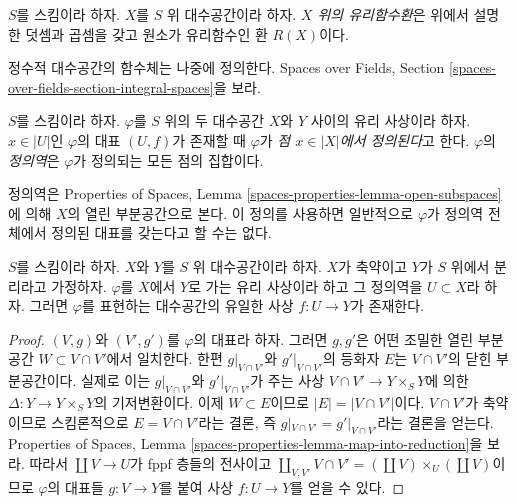 \begin{definition}
\label{definition-ring-of-rational-functions}
$S$를 스킴이라 하자.
$X$를 $S$ 위 대수공간이라 하자.
{\it $X$ 위의 유리함수환}은 위에서 설명한 덧셈과 곱셈을 갖고 원소가
유리함수인 환 $R(X)$이다.
\end{definition}

\noindent
정수적 대수공간의 함수체는 나중에 정의한다. Spaces over Fields,
Section \ref{spaces-over-fields-section-integral-spaces}을 보라.

\begin{definition}
\label{definition-domain-of-definition}
$S$를 스킴이라 하자. $\varphi$를 $S$ 위의 두 대수공간 $X$와 $Y$ 사이의
유리 사상이라 하자. $x \in |U|$인 $\varphi$의 대표
$(U, f)$가 존재할 때 $\varphi$가 {\it 점 $x \in |X|$에서 정의된다}고
한다. $\varphi$의 {\it 정의역}은 $\varphi$가 정의되는 모든 점의
집합이다.
\end{definition}

\noindent
정의역은 Properties of Spaces, Lemma
\ref{spaces-properties-lemma-open-subspaces}에 의해 $X$의 열린 부분공간으로
본다. 이 정의를 사용하면 일반적으로 $\varphi$가 정의역 전체에서 정의된
대표를 갖는다고 할 수는 없다.

\begin{lemma}
\label{lemma-rational-map-from-reduced-to-separated}
$S$를 스킴이라 하자. $X$와 $Y$를 $S$ 위 대수공간이라 하자.
$X$가 축약이고 $Y$가 $S$ 위에서 분리라고 가정하자. $\varphi$를
$X$에서 $Y$로 가는 유리 사상이라 하고 그 정의역을 $U \subset X$라
하자. 그러면 $\varphi$를 표현하는 대수공간의 유일한 사상
$f : U \to Y$가 존재한다.
\end{lemma}

\begin{proof}
$(V, g)$와 $(V', g')$를 $\varphi$의 대표라 하자. 그러면 $g, g'$은 어떤
조밀한 열린 부분공간 $W \subset V \cap V'$에서 일치한다. 한편
$g|_{V \cap V'}$와 $g'|_{V \cap V'}$의 등화자 $E$는
$V \cap V'$의 닫힌 부분공간이다. 실제로 이는 $g|_{V \cap V'}$와
$g'|_{V \cap V'}$가 주는 사상 $V \cap V' \to Y \times_S Y$에 의한
$\Delta : Y \to Y \times_S Y$의 기저변환이다. 이제 $W \subset E$이므로
$|E| = |V \cap V'|$이다. $V \cap V'$가 축약이므로 스킴론적으로
$E = V \cap V'$라는 결론, 즉 $g|_{V \cap V'} = g'|_{V \cap V'}$라는
결론을 얻는다. Properties of Spaces, Lemma
\ref{spaces-properties-lemma-map-into-reduction}을 보라. 따라서
$\coprod V \to U$가 fppf 층들의 전사이고
$\coprod_{V, V'} V \cap V' = (\coprod V) \times_U (\coprod V)$이므로
$\varphi$의 대표들 $g : V \to Y$를 붙여 사상 $f : U \to Y$를 얻을 수
있다.
\end{proof}


